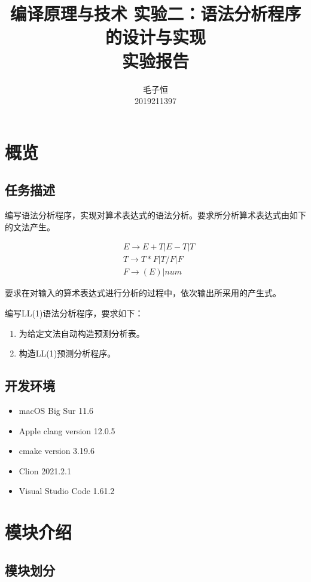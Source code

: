 \documentclass[lang=cn,11pt,a4paper,cite=authornum]{paper}
\title{编译原理与技术 实验二：语法分析程序的设计与实现 \\ 实验报告}
\author{毛子恒 \\ 2019211397}
\institute{北京邮电大学\ 计算机学院}
\date{\zhtoday}
\begin{document}
\maketitle

\section{概览}

\subsection{任务描述}

编写语法分析程序，实现对算术表达式的语法分析。要求所分析算术表达式由如下的文法产生。

\label{grammar}
$$
\begin{aligned}
& E\rightarrow E+T | E-T | T \\
& T\rightarrow T*F | T/F | F \\
& F\rightarrow (E) | num
\end{aligned}
$$

要求在对输入的算术表达式进行分析的过程中，依次输出所采用的产生式。

编写LL(1)语法分析程序，要求如下：

\begin{enumerate}
    \item 为给定文法自动构造预测分析表。
    \item 构造LL(1)预测分析程序。
\end{enumerate}

\subsection{开发环境}

\begin{itemize}
    \item macOS Big Sur 11.6
    \item Apple clang version 12.0.5
    \item cmake version 3.19.6
    \item Clion 2021.2.1
    \item Visual Studio Code 1.61.2
\end{itemize}

\section{模块介绍}

\subsection{模块划分}
\end{document}

